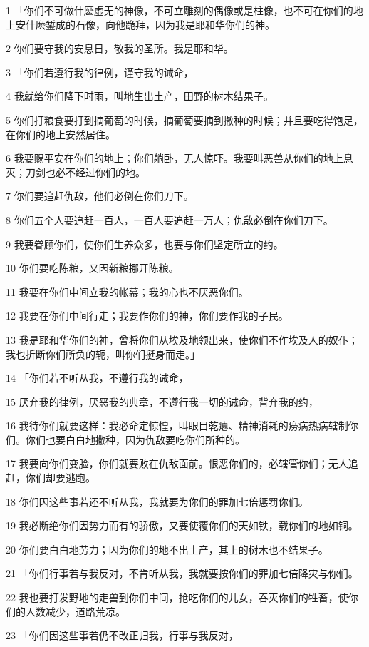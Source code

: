 \par 1 「你们不可做什麽虚无的神像，不可立雕刻的偶像或是柱像，也不可在你们的地上安什麽錾成的石像，向他跪拜，因为我是耶和华你们的神。
\par 2 你们要守我的安息日，敬我的圣所。我是耶和华。
\par 3 「你们若遵行我的律例，谨守我的诫命，
\par 4 我就给你们降下时雨，叫地生出土产，田野的树木结果子。
\par 5 你们打粮食要打到摘葡萄的时候，摘葡萄要摘到撒种的时候；并且要吃得饱足，在你们的地上安然居住。
\par 6 我要赐平安在你们的地上；你们躺卧，无人惊吓。我要叫恶兽从你们的地上息灭；刀剑也必不经过你们的地。
\par 7 你们要追赶仇敌，他们必倒在你们刀下。
\par 8 你们五个人要追赶一百人，一百人要追赶一万人；仇敌必倒在你们刀下。
\par 9 我要眷顾你们，使你们生养众多，也要与你们坚定所立的约。
\par 10 你们要吃陈粮，又因新粮挪开陈粮。
\par 11 我要在你们中间立我的帐幕；我的心也不厌恶你们。
\par 12 我要在你们中间行走；我要作你们的神，你们要作我的子民。
\par 13 我是耶和华你们的神，曾将你们从埃及地领出来，使你们不作埃及人的奴仆；我也折断你们所负的轭，叫你们挺身而走。」
\par 14 「你们若不听从我，不遵行我的诫命，
\par 15 厌弃我的律例，厌恶我的典章，不遵行我一切的诫命，背弃我的约，
\par 16 我待你们就要这样：我必命定惊惶，叫眼目乾瘪、精神消耗的痨病热病辖制你们。你们也要白白地撒种，因为仇敌要吃你们所种的。
\par 17 我要向你们变脸，你们就要败在仇敌面前。恨恶你们的，必辖管你们；无人追赶，你们却要逃跑。
\par 18 你们因这些事若还不听从我，我就要为你们的罪加七倍惩罚你们。
\par 19 我必断绝你们因势力而有的骄傲，又要使覆你们的天如铁，载你们的地如铜。
\par 20 你们要白白地劳力；因为你们的地不出土产，其上的树木也不结果子。
\par 21 「你们行事若与我反对，不肯听从我，我就要按你们的罪加七倍降灾与你们。
\par 22 我也要打发野地的走兽到你们中间，抢吃你们的儿女，吞灭你们的牲畜，使你们的人数减少，道路荒凉。
\par 23 「你们因这些事若仍不改正归我，行事与我反对，
